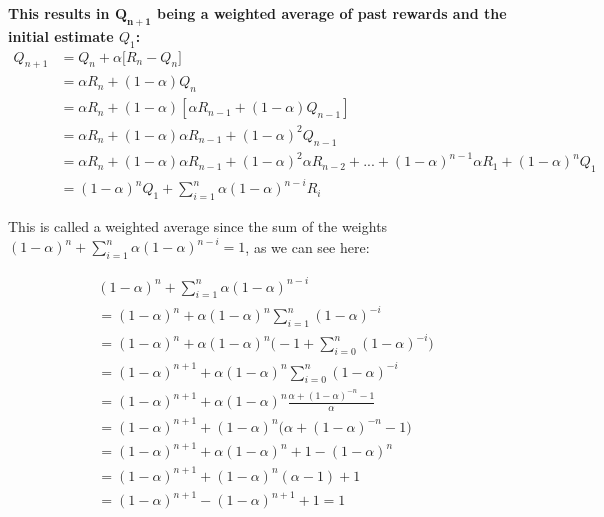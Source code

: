 \textbf{This results in $\boldsymbol{Q_{n+1}}$ being a weighted average of past rewards and the initial estimate $Q_1$:}
\begin{equation}
    \begin{split}
        Q_{n+1} &= Q_n + \alpha \Big[ R_n - Q_n \Big] \\
        &= \alpha R_n + (1 - \alpha) Q_n \\
        &= \alpha R_n + (1 - \alpha) [\alpha R_{n-1} + (1 - \alpha) Q_{n-1}] \\
        &= \alpha R_n + (1 - \alpha) \alpha R_{n-1} + (1 - \alpha)^2 Q_{n-1} \\
        &= \alpha R_n + (1 - \alpha) \alpha R_{n-1} + (1 - \alpha)^2 \alpha R_{n-2} + ... + (1 - \alpha)^{n-1} \alpha R_1 + (1 - \alpha)^n Q_1 \\
        &= (1 - \alpha)^n Q_1 + \sum_{i=1}^{n} \alpha (1 - \alpha)^{n-i} R_i
    \end{split}
    \label{eq:ch3-exponentialrecencyweightedaverage}
\end{equation}

This is called a weighted average since the sum of the weights $(1 - \alpha)^n + \sum_{i=1}^{n} \alpha (1 - \alpha)^{n-i} = 1$, as we can see here:

\begin{equation*}
    \begin{split}
        & (1 - \alpha)^n + \sum_{i=1}^{n} \alpha (1 - \alpha)^{n-i} \\
        &= (1 - \alpha)^n + \alpha (1 - \alpha)^n \sum_{i=1}^{n} (1 - \alpha)^{-i} \\
        &= (1 - \alpha)^n + \alpha (1 - \alpha)^n \Big(-1 + \sum_{i=0}^{n} (1 - \alpha)^{-i} \Big) \\
        &= (1 - \alpha)^{n+1} + \alpha (1 - \alpha)^n \sum_{i=0}^{n} (1 - \alpha)^{-i} \\
        &= (1 - \alpha)^{n+1} + \alpha (1 - \alpha)^n \frac{\alpha + (1 - \alpha)^{-n} -1}{\alpha} \\
        &= (1 - \alpha)^{n+1} + (1 - \alpha)^n \Big( \alpha + (1 - \alpha)^{-n} -1 \Big) \\
        &= (1 - \alpha)^{n+1} + \alpha (1 - \alpha)^n + 1 - (1 - \alpha)^n \\
        &= (1 - \alpha)^{n+1} + (1 - \alpha)^n (\alpha - 1) + 1 \\
        &= (1 - \alpha)^{n+1} - (1 - \alpha)^{n+1} + 1 = 1
    \end{split}
\end{equation*}

